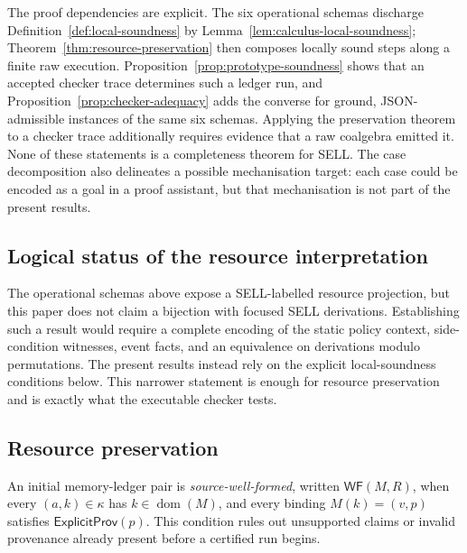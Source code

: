 \documentclass[a4paper,fleqn]{cas-sc}
\begin{document}
The proof dependencies are explicit. The six operational schemas discharge
Definition~\ref{def:local-soundness} by
Lemma~\ref{lem:calculus-local-soundness};
Theorem~\ref{thm:resource-preservation} then composes locally sound steps
along a finite raw execution. Proposition~\ref{prop:prototype-soundness}
shows that an accepted checker trace determines such a ledger run, and
Proposition~\ref{prop:checker-adequacy} adds the converse for ground,
JSON-admissible instances of the same six schemas. Applying the preservation
theorem to a checker trace additionally requires evidence that a raw
coalgebra emitted it. None of these statements is a completeness theorem for
SELL. The case decomposition also delineates a possible mechanisation target:
each case could be encoded as a goal in a proof assistant, but that
mechanisation is not part of the present results.

\subsection{Logical status of the resource interpretation}

The operational schemas above expose a SELL-labelled resource projection,
but this paper does not claim a bijection with focused SELL derivations.
Establishing such a result would require a complete encoding of the static
policy context, side-condition witnesses, event facts, and an equivalence on
derivations modulo permutations. The present results instead rely on the
explicit local-soundness conditions below. This narrower statement is enough
for resource preservation and is exactly what the executable checker tests.

\subsection{Resource preservation}

An initial memory-ledger pair is \emph{source-well-formed}, written
\(\mathsf{WF}(M,R)\), when every \((a,k)\in\kappa\) has
\(k\in\operatorname{dom}(M)\), and every binding \(M(k)=(v,p)\) satisfies
\(\mathsf{ExplicitProv}(p)\). This condition rules out unsupported claims or
invalid provenance already present before a certified run begins.
\end{document}
